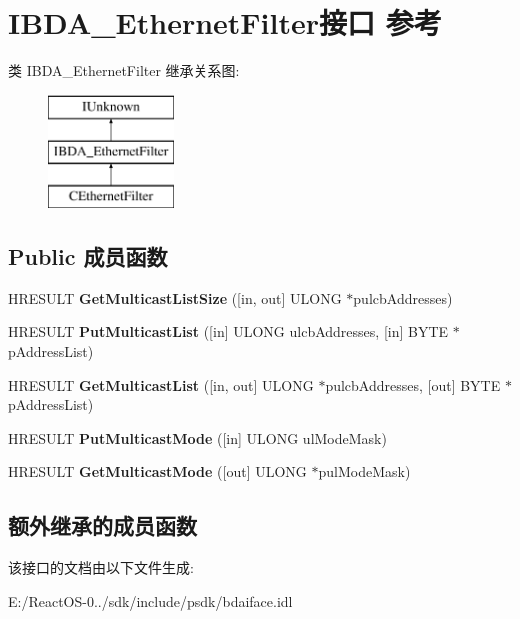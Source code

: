 \hypertarget{interface_i_b_d_a___ethernet_filter}{}\section{I\+B\+D\+A\+\_\+\+Ethernet\+Filter接口 参考}
\label{interface_i_b_d_a___ethernet_filter}
类 I\+B\+D\+A\+\_\+\+Ethernet\+Filter 继承关系图\+:\begin{figure}[H]
\begin{center}
\leavevmode
\includegraphics[height=3.000000cm]{interface_i_b_d_a___ethernet_filter}
\end{center}
\end{figure}
\subsection*{Public 成员函数}
\begin{DoxyCompactItemize}
\item 
\mbox{\label{interface_i_b_d_a___ethernet_filter_a66bd2dd0cf15eb6e0b76cddbac3108f7}} 
H\+R\+E\+S\+U\+LT {\bfseries Get\+Multicast\+List\+Size} (\mbox{[}in, out\mbox{]} U\+L\+O\+NG $\ast$pulcb\+Addresses)
\item 
\mbox{\label{interface_i_b_d_a___ethernet_filter_a64b99eba9d4d561379901f007429b9d9}} 
H\+R\+E\+S\+U\+LT {\bfseries Put\+Multicast\+List} (\mbox{[}in\mbox{]} U\+L\+O\+NG ulcb\+Addresses, \mbox{[}in\mbox{]} B\+Y\+TE $\ast$p\+Address\+List)
\item 
\mbox{\label{interface_i_b_d_a___ethernet_filter_a7e405966552ed2b316457e5276552c2e}} 
H\+R\+E\+S\+U\+LT {\bfseries Get\+Multicast\+List} (\mbox{[}in, out\mbox{]} U\+L\+O\+NG $\ast$pulcb\+Addresses, \mbox{[}out\mbox{]} B\+Y\+TE $\ast$p\+Address\+List)
\item 
\mbox{\label{interface_i_b_d_a___ethernet_filter_acc71c89c92b07dc09e6d17da1535eb4a}} 
H\+R\+E\+S\+U\+LT {\bfseries Put\+Multicast\+Mode} (\mbox{[}in\mbox{]} U\+L\+O\+NG ul\+Mode\+Mask)
\item 
\mbox{\label{interface_i_b_d_a___ethernet_filter_a867b960533d9ae8906ff9e5dcbd24ed6}} 
H\+R\+E\+S\+U\+LT {\bfseries Get\+Multicast\+Mode} (\mbox{[}out\mbox{]} U\+L\+O\+NG $\ast$pul\+Mode\+Mask)
\end{DoxyCompactItemize}
\subsection*{额外继承的成员函数}


该接口的文档由以下文件生成\+:\begin{DoxyCompactItemize}
\item 
E\+:/\+React\+O\+S-\/0../sdk/include/psdk/bdaiface.\+idl\end{DoxyCompactItemize}
